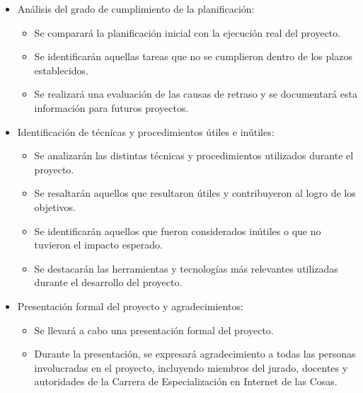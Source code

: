 \documentclass[
11pt, %
]{charter}
\begin{document}
\begin{itemize}
	\item Análisis del grado de cumplimiento de la planificación:
		\begin{itemize}
		\item Se comparará la planificación inicial con la ejecución real del proyecto. 
		\item Se identificarán aquellas tareas que no se cumplieron dentro de los plazos establecidos.
		\item Se realizará una evaluación de las causas de retraso y se documentará esta información para futuros proyectos. 
	 \end{itemize}
	\item Identificación de técnicas y procedimientos útiles e inútiles:
		\begin{itemize}
		\item Se analizarán las distintas técnicas y procedimientos utilizados durante el proyecto.
		\item Se resaltarán aquellos que resultaron útiles y contribuyeron al logro de los objetivos.
		\item Se identificarán aquellos que fueron considerados inútiles o que no tuvieron el impacto esperado.
		\item Se destacarán las herramientas y tecnologías más relevantes utilizadas durante el desarrollo del proyecto.
	 \end{itemize}
	\item Presentación formal del proyecto y agradecimientos:
		\begin{itemize}
		\item Se llevará a cabo una presentación formal del proyecto. 
		\item Durante la presentación, se expresará agradecimiento a todas las personas involucradas en el proyecto, incluyendo miembros del jurado, docentes y autoridades de la Carrera de Especialización en Internet de las Cosas.
	 \end{itemize}
\end{itemize}
\end{document}
